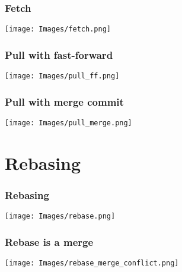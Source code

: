 \documentclass{beamer}
\begin{document}
	\begin{frame}[plain]
		\frametitle{Fetch}
	
		\begin{center}
			\texttt{[image: Images/fetch.png]}
		\end{center}
	
	\end{frame}

	\begin{frame}[plain]
		\frametitle{Pull with fast-forward}
		
		\begin{center}
			\texttt{[image: Images/pull\_ff.png]}
		\end{center}
		
	\end{frame}

	\begin{frame}[plain]
		\frametitle{Pull with merge commit}
	
		\begin{center}
			\texttt{[image: Images/pull\_merge.png]}
		\end{center}	
	
	\end{frame}

	\section{Rebasing}
	\begin{frame}[plain]
		\frametitle{Rebasing}
	
		\begin{center}
			\texttt{[image: Images/rebase.png]}
		\end{center}
	
	\end{frame}

	\begin{frame}[plain]
		\frametitle{Rebase is a merge}
	
		\begin{center}
			\texttt{[image: Images/rebase\_merge\_conflict.png]}
		\end{center}
	
	\end{frame}
\end{document}
